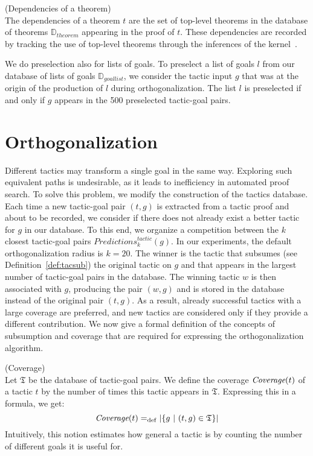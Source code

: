 \documentclass[runningheads,a4paper,draft]{svjour3}
\begin{document}
\begin{definition}\label{def:thmdep}(Dependencies of a theorem)\\
The dependencies of a theorem $t$ are the set of top-level theorems in
the database of theorems $\mathbb{D}_{\mathit{theorem}}$ appearing in the proof 
of $t$. These 
dependencies are recorded by tracking the use of top-level theorems through the 
inferences of the
kernel~\cite{tgck-cpp15}.
\end{definition}


We do preselection also for lists of goals.
To preselect a list of goals $l$ from our database of lists of goals 
$\mathbb{D}_{\mathit{goallist}}$, we
consider the tactic input $g$ that was at the origin of the production of $l$
during orthogonalization. The list $l$ is preselected if and only if $g$
appears in the 500 preselected tactic-goal pairs.

\section{Orthogonalization}\label{sec:ortho}
Different tactics may transform a single goal in the same way. Exploring such
equivalent paths
is undesirable, as it leads to inefficiency in automated proof search.
To solve this problem, we modify the construction of the tactics database.
Each time a new tactic-goal pair $(t,g)$ is extracted from a tactic proof and
about to be recorded, we consider if there does not already exist a better
tactic for $g$ in our database. To this end, we organize a competition between
the
$k$ closest tactic-goal pairs $\mathit{Predictions}^{\mathit{tactic}}_k(g)$.
In our experiments,
the default orthogonalization radius is $k=20$.
The winner is the tactic that subsumes (see Definition~\ref{def:tacsub}) the
original tactic on $g$ and that
appears in the largest number of tactic-goal pairs in the database.
The winning tactic $w$ is then associated with $g$, producing the pair $(w,g)$
and is stored in the database instead of the original pair $(t,g)$.
As a result, already successful tactics with a large coverage are preferred,
and new tactics are considered only if they provide a different contribution.
We now give a formal definition of the concepts of subsumption and coverage
that are required for expressing the orthogonalization algorithm.

\begin{definition} (Coverage)\\
Let $\mathfrak{T}$ be the database of tactic-goal pairs. We define the
coverage $\textit{\mbox{Coverage}}(t)$ of a tactic $t$ by the number of times
this tactic
appears in
$\mathfrak{T}$. Expressing this in a formula, we get:
\[\textit{\mbox{Coverage}}(t) =_{\mathrm{def}} |\lbrace g\ |\ (t,g) \in
  \mathfrak{T} \rbrace| \]
Intuitively, this notion estimates how general a tactic is by counting the
number of different goals it is useful for.
\end{definition}
\end{document}
